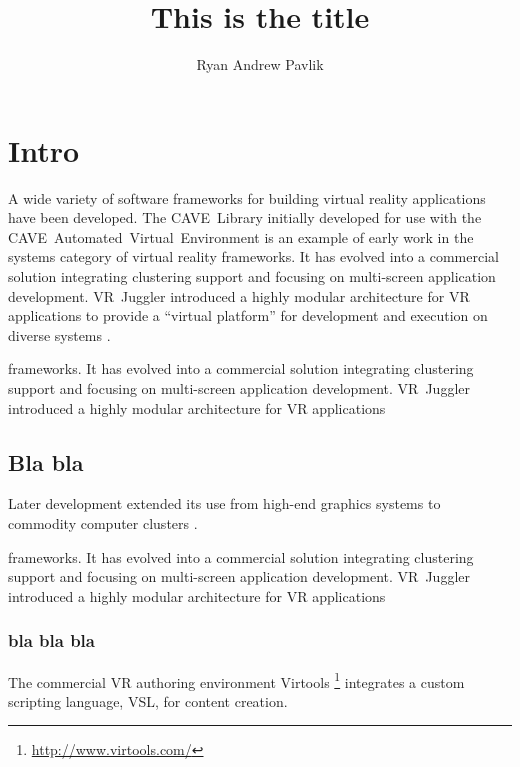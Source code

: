 \documentclass[draftcls]{rpisudiss}
\title{This is the title}
\author{Ryan Andrew Pavlik}
\begin{document}
\thispagestyle{empty}
\maketitle

\pagestyle{fancy}
\tableofcontents{}
\listoffigures
\listoftables


\chapter{Intro}


A wide variety of software frameworks for building virtual reality
applications have been developed. The CAVE~Library initially developed
for use with the CAVE~Automated~Virtual~Environment \cite{Cruz-Neira1993}
is an example of early work in the systems category of virtual reality
frameworks. It has evolved into a commercial solution integrating
clustering support and focusing on multi-screen application development.
VR~Juggler introduced a highly modular architecture for VR applications
to provide a ``virtual platform'' for development and execution
on diverse systems \cite{Bierbaum2001,Bierbaum2005}.

frameworks. It has evolved into a commercial solution integrating
clustering support and focusing on multi-screen application development.
VR~Juggler introduced a highly modular architecture for VR applications

\section{Bla bla}
Later development
extended its use from high-end graphics systems to commodity computer
clusters \cite{Allard2002,Bierbaum2005}.


frameworks. It has evolved into a commercial solution integrating
clustering support and focusing on multi-screen application development.
VR~Juggler introduced a highly modular architecture for VR applications

\subsection{bla bla bla}
The commercial
VR authoring environment Virtools%
\footnote{\url{http://www.virtools.com/}%
} integrates a custom scripting language, VSL, for content creation.
\end{document}

